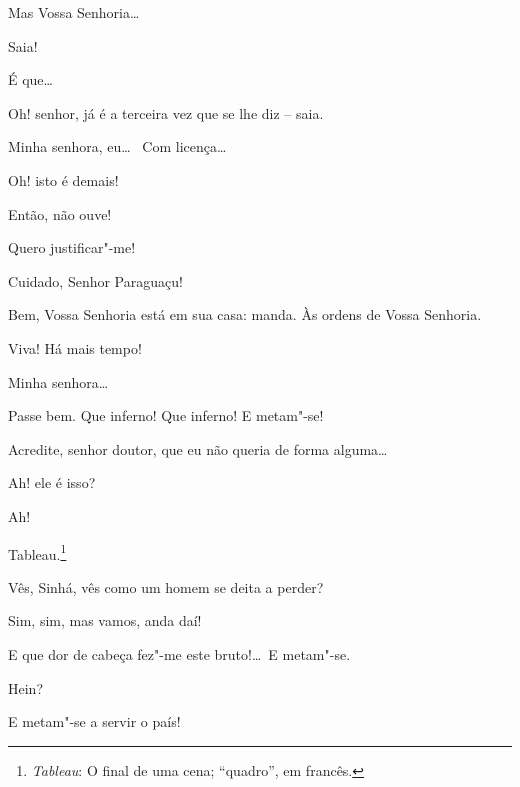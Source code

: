  Mas Vossa Senhoria\ldots

 Saia!

 É que\ldots

 Oh! senhor, já é a terceira vez que se lhe diz -- saia.

 Minha senhora, eu\ldots\  Com licença\ldots

 Oh! isto é demais!

 Então, não ouve!

 Quero justificar"-me!

  Cuidado, Senhor Paraguaçu!

 Bem, Vossa Senhoria está em sua casa: manda.
 Às ordens
de Vossa Senhoria.

 Viva! Há mais tempo! 

 Minha senhora\ldots

 Passe bem.  Que inferno!
Que inferno! E metam"-se!

  Acredite, senhor doutor, que eu não
queria de forma alguma\ldots

  Ah! ele é isso? 

  Ah! 

  Tableau.\footnote{ \textit{Tableau}: O final de uma cena;
``quadro'', em francês.}




 Vês, Sinhá, vês como um homem se deita a perder?

 Sim, sim, mas vamos, anda daí!

  E que dor
de cabeça fez"-me este bruto!\ldots\ E metam"-se.

 Hein?

 E metam"-se a servir o país!

